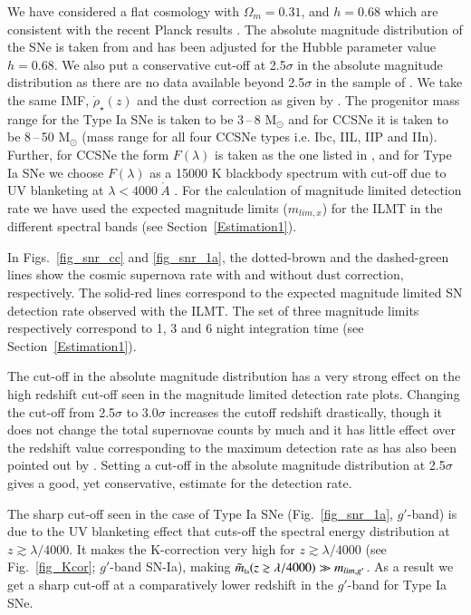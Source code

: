 \documentclass[useAMS,usenatbib]{mnras}
\begin{document}
We have considered a flat cosmology with $\Omega_m = 0.31$, and $h = 0.68$ which are consistent with the 
recent Planck results \citeyearpar[Planck Collaboration XIII][]{2016A&A...594A..13P}. The absolute magnitude 
distribution of the SNe is taken from \citet{2014AJ....147..118R} and has been adjusted for the Hubble 
parameter value $h = 0.68$. We also put a conservative cut-off at 2.5$\sigma$ in the absolute magnitude 
distribution as there are no data available beyond 2.5$\sigma$ in the sample of \citet{2014AJ....147..118R}. 
We take the same IMF, $\dot\rho_\star(z)$ and the dust correction as given by \citet{2009JCAP...01..047L}. 
The progenitor mass range for the Type Ia SNe is taken to be 3\,--\,8 M$_{\odot}$ and for CCSNe it is taken 
to be 8\,--\,50 M$_{\odot}$ (mass range for all four CCSNe types i.e. Ibc, IIL, IIP and IIn). 
Further, for CCSNe the form $F(\lambda)$ is taken as the one listed in \citet{2009JCAP...01..047L}, 
and for Type Ia SNe we choose  $F(\lambda)$ as a 15000 K blackbody spectrum with cut-off 
due to UV blanketing at $\lambda < 4000 \ \mathring{A}$ \citep{1999A&A...350..349D,2011ApJ...729...55F}. 
For the calculation of magnitude limited detection rate we have used the expected magnitude limits 
($m_{lim,x}$) for the ILMT in the different spectral bands (see Section~\ref{Estimation1}).


In Figs.~\ref{fig_snr_cc} and \ref{fig_snr_1a}, the dotted-brown and the dashed-green lines show the 
cosmic supernova rate with and without dust correction, respectively. The solid-red lines correspond 
to the expected magnitude limited SN detection rate observed with the ILMT. The set of three 
magnitude limits respectively correspond to 1, 3 and 6 night integration time 
(see Section~\ref{Estimation1}).

The cut-off in the absolute magnitude distribution has a very strong effect on the high redshift 
cut-off seen in the magnitude limited detection rate plots. Changing the cut-off from 2.5$\sigma$ 
to 3.0$\sigma$ increases the cutoff redshift drastically, though it does not change the total 
supernovae counts by much and it has little effect over the redshift value corresponding to 
the maximum detection rate as has also been pointed out by \citet{2009JCAP...01..047L}. 
Setting a cut-off in the absolute magnitude distribution at 2.5$\sigma$ gives a good, 
yet conservative, estimate for the detection rate.

The sharp cut-off seen in the case of Type Ia SNe (Fig.~\ref{fig_snr_1a}, $g'$-band) is due to the UV 
blanketing effect that cuts-off the spectral energy distribution at $z \gtrsim \lambda/4000$. It makes the 
K-correction very high for $z \gtrsim \lambda/4000$ (see Fig.~\ref{fig_Kcor}; $g'$-band SN-Ia), making 
$\tilde{m}_{\rm \scriptscriptstyle Ia}(z \gtrsim \lambda/4000) \gg m_{lim,g'}$. 
As a result we get a sharp cut-off at a comparatively lower redshift in the $g'$-band for Type Ia SNe.
\end{document}
